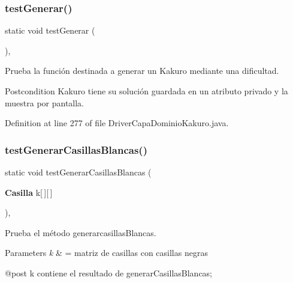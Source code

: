 \subsubsection{test\+Generar()}
{\footnotesize\ttfamily static void test\+Generar (\begin{DoxyParamCaption}{ }\end{DoxyParamCaption})\hspace{0.3cm}{\ttfamily [inline]}, {\ttfamily [static]}}



Prueba la función destinada a generar un Kakuro mediante una dificultad. 

\begin{DoxyPostcond}{Postcondition}
Kakuro tiene su solución guardada en un atributo privado y la muestra por pantalla. 
\end{DoxyPostcond}


Definition at line 277 of file Driver\+Capa\+Dominio\+Kakuro.\+java.

\mbox{\label{class_dominio_1_1controladores_1_1_drivers_1_1_driver_capa_dominio_kakuro_a57efc137e015cbceb01a752a828a409b}} 
\subsubsection{test\+Generar\+Casillas\+Blancas()}
{\footnotesize\ttfamily static void test\+Generar\+Casillas\+Blancas (\begin{DoxyParamCaption}\item[{\textbf{ Casilla}}]{k[$\,$][$\,$] }\end{DoxyParamCaption})\hspace{0.3cm}{\ttfamily [inline]}, {\ttfamily [static]}}



Prueba el método generarcasillas\+Blancas. 


\begin{DoxyParams}{Parameters}
{\em k} & = matriz de casillas con casillas negras \begin{DoxyVerb}@post k contiene el resultado de generarCasillasBlancas;\end{DoxyVerb}
 \\
\hline
\end{DoxyParams}


